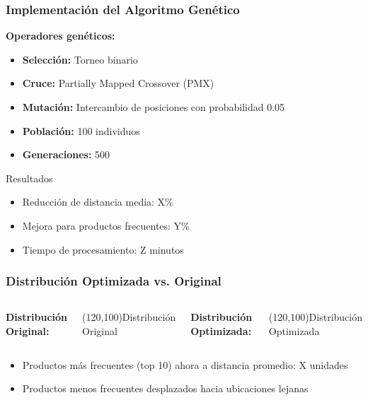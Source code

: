 \documentclass[aspectratio=169]{beamer}
\begin{document}
\begin{frame}
    \frametitle{Implementación del Algoritmo Genético}
    \textbf{Operadores genéticos:}
    \begin{itemize}
        \item \textbf{Selección:} Torneo binario
        \item \textbf{Cruce:} Partially Mapped Crossover (PMX)
        \item \textbf{Mutación:} Intercambio de posiciones con probabilidad 0.05
        \item \textbf{Población:} 100 individuos
        \item \textbf{Generaciones:} 500
    \end{itemize}
    
    \vspace{0.3cm}
    \begin{block}{Resultados}
        \begin{itemize}
            \item Reducción de distancia media: X\%
            \item Mejora para productos frecuentes: Y\%
            \item Tiempo de procesamiento: Z minutos
        \end{itemize}
    \end{block}
\end{frame}

\begin{frame}
    \frametitle{Distribución Optimizada vs. Original}
    \begin{columns}
        \textbf{Distribución Original:}
        \begin{center}
            \framebox(120,100){Distribución Original}
        \end{center}
        
        \textbf{Distribución Optimizada:}
        \begin{center}
            \framebox(120,100){Distribución Optimizada}
        \end{center}
    \end{columns}
    
    \vspace{0.3cm}
    \begin{itemize}
        \item Productos más frecuentes (top 10) ahora a distancia promedio: X unidades
        \item Productos menos frecuentes desplazados hacia ubicaciones lejanas
    \end{itemize}
\end{frame}
\end{document}
